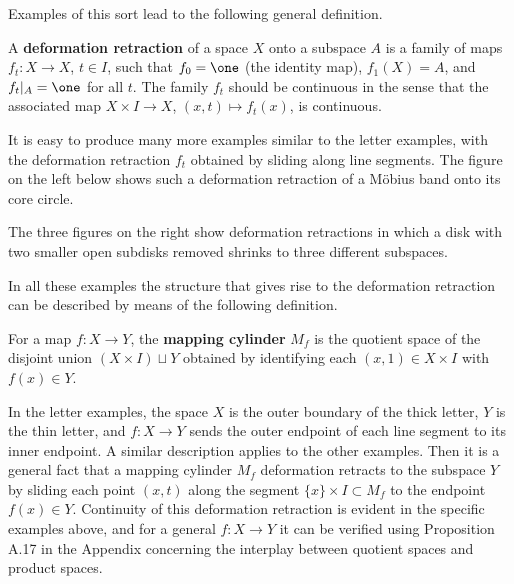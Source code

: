 Examples of this sort lead to the following general definition.

\begin{definition}
\label{def:deformation-retraction}
\leanok
{}
A \textbf{deformation retraction} of a space $X$ onto a subspace $A$ is a family of maps
$f_t : X \to X$, $t \in I$, such that $f_0 = \one$ (the identity map), $f_1(X) = A$, and
$f_t|_A = \one$ for all $t$. The family $f_t$ should be continuous in the sense that the
associated map $X \times I \to X$, $(x,t) \mapsto f_t(x)$, is continuous.
\end{definition}

It is easy to produce many more examples similar to the letter examples, with the
deformation retraction $f_t$ obtained by sliding along line segments. The figure on the
left below shows such a deformation retraction of a M\"obius band onto its core circle.



The three figures on the right show deformation retractions in which a disk with two
smaller open subdisks removed shrinks to three different subspaces.

In all these examples the structure that gives rise to the deformation retraction can
be described by means of the following definition.

\begin{definition}
\label{def:mapping-cylinder}
\leanok
For a map $f : X \to Y$, the \textbf{mapping cylinder} $M_f$ is the quotient space of the
disjoint union $(X \times I) \sqcup Y$ obtained by identifying each $(x,1) \in X \times I$ with
$f(x) \in Y$.
\end{definition}

In the letter examples, the space $X$ is the outer boundary of the thick letter, $Y$ is
the thin letter, and $f : X \to Y$ sends the outer endpoint of each line segment to its
inner endpoint. A similar description applies to the other examples. Then it is a general
fact that a mapping cylinder $M_f$ deformation retracts to the subspace $Y$ by sliding
each point $(x,t)$ along the segment $\{x\} \times I \subset M_f$ to the endpoint $f(x) \in Y$.
Continuity of this deformation retraction is evident in the specific examples above, and
for a general $f : X \to Y$ it can be verified using Proposition A.17 in the Appendix
concerning the interplay between quotient spaces and product spaces.

